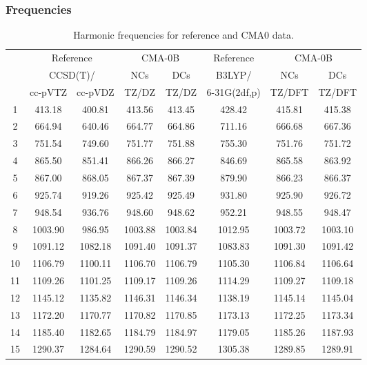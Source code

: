\documentclass[10pt,oneside]{article}
\begin{document}
\clearpage

\subsubsection*{Frequencies}
\begin{table}[h!]
\centering
\caption{Harmonic frequencies for reference and CMA0 data.}
\begin{tabular}{cccccccc}
\toprule
{} & \multicolumn{2}{c}{Reference} & \multicolumn{2}{c}{CMA-0B} &    Reference & \multicolumn{2}{c}{CMA-0B} \\
{} & \multicolumn{2}{c}{CCSD(T)/} &     NCs &     DCs &       B3LYP/ &     NCs &     DCs \\
{} &   cc-pVTZ & cc-pVDZ &   TZ/DZ &   TZ/DZ & 6-31G(2df,p) &  TZ/DFT &  TZ/DFT \\
\midrule
1  &    413.18 &  400.81 &  413.56 &  413.45 &       428.42 &  415.81 &  415.38 \\
2  &    664.94 &  640.46 &  664.77 &  664.86 &       711.16 &  666.68 &  667.36 \\
3  &    751.54 &  749.60 &  751.77 &  751.88 &       755.30 &  751.76 &  751.72 \\
4  &    865.50 &  851.41 &  866.26 &  866.27 &       846.69 &  865.58 &  863.92 \\
5  &    867.00 &  868.05 &  867.37 &  867.39 &       879.90 &  866.23 &  866.37 \\
6  &    925.74 &  919.26 &  925.42 &  925.49 &       931.80 &  925.90 &  926.72 \\
7  &    948.54 &  936.76 &  948.60 &  948.62 &       952.21 &  948.55 &  948.47 \\
8  &   1003.90 &  986.95 & 1003.88 & 1003.84 &      1012.95 & 1003.72 & 1003.10 \\
9  &   1091.12 & 1082.18 & 1091.40 & 1091.37 &      1083.83 & 1091.30 & 1091.42 \\
10 &   1106.79 & 1100.11 & 1106.70 & 1106.79 &      1105.30 & 1106.84 & 1106.64 \\
11 &   1109.26 & 1101.25 & 1109.17 & 1109.26 &      1114.29 & 1109.27 & 1109.18 \\
12 &   1145.12 & 1135.82 & 1146.31 & 1146.34 &      1138.19 & 1145.14 & 1145.04 \\
13 &   1172.20 & 1170.77 & 1170.82 & 1170.85 &      1173.13 & 1172.25 & 1173.34 \\
14 &   1185.40 & 1182.65 & 1184.79 & 1184.97 &      1179.05 & 1185.26 & 1187.93 \\
15 &   1290.37 & 1284.64 & 1290.59 & 1290.52 &      1305.38 & 1289.85 & 1289.91 \\

\end{tabular}
\end{table}
\end{document}
